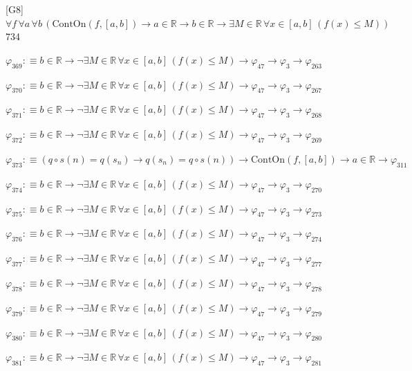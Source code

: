\begin{fullproof}{[G8]}{$\forall f\,\forall a\,\forall b\,(\mathrm{ContOn}(f,[a,b]) \to a \in \mathbb{R} \to b \in \mathbb{R} \to \exists M \in \mathbb{R}\,\forall x \in [a,b]\,(f(x) \leq M))$}{734}
\begin{abbrevlist}
\item $\varphi_{369} :\equiv b \in \mathbb{R} \to \neg \exists M \in \mathbb{R}\,\forall x \in [a,b]\,(f(x) \leq M) \to \varphi_{47} \to \varphi_{3} \to \varphi_{263}$
\item $\varphi_{370} :\equiv b \in \mathbb{R} \to \neg \exists M \in \mathbb{R}\,\forall x \in [a,b]\,(f(x) \leq M) \to \varphi_{47} \to \varphi_{3} \to \varphi_{267}$
\item $\varphi_{371} :\equiv b \in \mathbb{R} \to \neg \exists M \in \mathbb{R}\,\forall x \in [a,b]\,(f(x) \leq M) \to \varphi_{47} \to \varphi_{3} \to \varphi_{268}$
\item $\varphi_{372} :\equiv b \in \mathbb{R} \to \neg \exists M \in \mathbb{R}\,\forall x \in [a,b]\,(f(x) \leq M) \to \varphi_{47} \to \varphi_{3} \to \varphi_{269}$
\item $\varphi_{373} :\equiv (q \circ s(n) = q(s_{n}) \to q(s_{n}) = q \circ s(n)) \to \mathrm{ContOn}(f,[a,b]) \to a \in \mathbb{R} \to \varphi_{311}$
\item $\varphi_{374} :\equiv b \in \mathbb{R} \to \neg \exists M \in \mathbb{R}\,\forall x \in [a,b]\,(f(x) \leq M) \to \varphi_{47} \to \varphi_{3} \to \varphi_{270}$
\item $\varphi_{375} :\equiv b \in \mathbb{R} \to \neg \exists M \in \mathbb{R}\,\forall x \in [a,b]\,(f(x) \leq M) \to \varphi_{47} \to \varphi_{3} \to \varphi_{273}$
\item $\varphi_{376} :\equiv b \in \mathbb{R} \to \neg \exists M \in \mathbb{R}\,\forall x \in [a,b]\,(f(x) \leq M) \to \varphi_{47} \to \varphi_{3} \to \varphi_{274}$
\item $\varphi_{377} :\equiv b \in \mathbb{R} \to \neg \exists M \in \mathbb{R}\,\forall x \in [a,b]\,(f(x) \leq M) \to \varphi_{47} \to \varphi_{3} \to \varphi_{277}$
\item $\varphi_{378} :\equiv b \in \mathbb{R} \to \neg \exists M \in \mathbb{R}\,\forall x \in [a,b]\,(f(x) \leq M) \to \varphi_{47} \to \varphi_{3} \to \varphi_{278}$
\item $\varphi_{379} :\equiv b \in \mathbb{R} \to \neg \exists M \in \mathbb{R}\,\forall x \in [a,b]\,(f(x) \leq M) \to \varphi_{47} \to \varphi_{3} \to \varphi_{279}$
\item $\varphi_{380} :\equiv b \in \mathbb{R} \to \neg \exists M \in \mathbb{R}\,\forall x \in [a,b]\,(f(x) \leq M) \to \varphi_{47} \to \varphi_{3} \to \varphi_{280}$
\item $\varphi_{381} :\equiv b \in \mathbb{R} \to \neg \exists M \in \mathbb{R}\,\forall x \in [a,b]\,(f(x) \leq M) \to \varphi_{47} \to \varphi_{3} \to \varphi_{281}$

\end{abbrevlist}
\end{fullproof}

